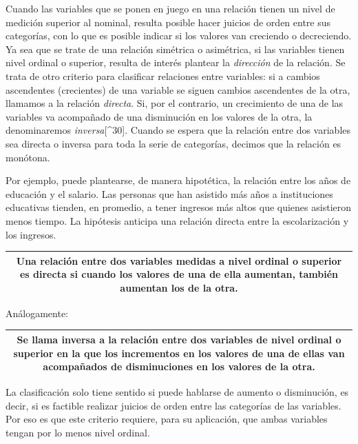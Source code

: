 \documentclass[]{book}
\begin{document}
Cuando las variables que se ponen en juego en una relación tienen un
nivel de medición superior al nominal, resulta posible hacer juicios de orden entre sus categorías, con lo que es posible indicar si los valores
van creciendo o decreciendo. Ya sea que se trate de una relación
simétrica o asimétrica, si las variables tienen nivel ordinal o
superior, resulta de interés plantear la \emph{dirección} de la relación.
Se trata de otro criterio para clasificar relaciones entre variables: si
a cambios ascendentes (crecientes) de una variable se siguen cambios
ascendentes de la otra, llamamos a la relación \emph{directa}. Si, por el
contrario, un crecimiento de una de las variables va acompañado de una
disminución en los valores de la otra, la denominaremos
\emph{inversa}{[}\^{}30{]}. Cuando se espera que la relación entre dos variables
sea directa o inversa para toda la serie de categorías, decimos que la
relación es monótona.

Por ejemplo, puede plantearse, de manera hipotética, la relación entre
los años de educación y el salario. Las personas que han asistido más
años a instituciones educativas tienden, en promedio, a tener ingresos
más altos que quienes asistieron menos tiempo. La hipótesis anticipa una
relación directa entre la escolarización y los ingresos.

\begin{longtable}[]{@{}c@{}}
\toprule
\endhead
\begin{minipage}[t]{0.97\columnwidth}\centering
Una relación entre dos variables medidas a nivel ordinal o superior es \textbf{directa} si cuando los valores de una de ella aumentan, también aumentan los de la otra.\strut
\end{minipage}\tabularnewline
\bottomrule
\end{longtable}

Análogamente:

\begin{longtable}[]{@{}c@{}}
\toprule
\endhead
\begin{minipage}[t]{0.97\columnwidth}\centering
Se llama \textbf{inversa} a la relación entre dos variables de nivel ordinal o superior en la que los incrementos en los valores de una de ellas van acompañados de disminuciones en los valores de la otra.\strut
\end{minipage}\tabularnewline
\bottomrule
\end{longtable}

La clasificación solo tiene sentido si puede hablarse de aumento o
disminución, es decir, si es factible realizar juicios de orden entre
las categorías de las variables. Por eso es que este criterio requiere,
para su aplicación, que ambas variables tengan por lo menos nivel
ordinal.
\end{document}
